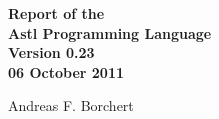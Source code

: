 \begin{titlepage}
   \begin{flushright}


      {\Huge \bfseries
	 Report of the \\
	 Astl Programming Language \\
	 Version 0.23 \\
	 06 October 2011 \\
      }

      \vspace*{\fill}

      {\huge
	 Andreas F. Borchert \\
      }
   \end{flushright}
\end{titlepage}
